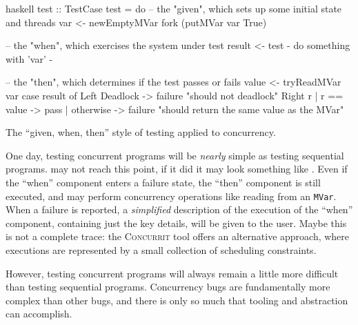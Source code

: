 \begin{listing}
\centering
\begin{cminted}{haskell}
test :: TestCase
test = do
    -- the "given", which sets up some initial state and threads
    var <- newEmptyMVar
    fork (putMVar var True)

    -- the "when", which exercises the system under test
    result <- test {- do something with 'var' -}

    -- the "then", which determines if the test passes or fails
    value <- tryReadMVar var
    case result of
      Left Deadlock -> failure "should not deadlock"
      Right r
        | r == value -> pass
        | otherwise -> failure "should return the same value as the MVar"
\end{cminted}
\caption{The ``given, when, then'' style of testing applied to concurrency.}\label{lst:3part}
\end{listing}

One day, testing concurrent programs will be \emph{nearly} simple as
testing sequential programs.  \dejafu{} may not reach this point, if
it did it may look something like .  Even if the
``when'' component enters a failure state, the ``then'' component is
still executed, and may perform concurrency operations like reading
from an \verb|MVar|.  When a failure is reported, a \emph{simplified}
description of the execution of the ``when'' component, containing
just the key details, will be given to the user.  Maybe this is not a
complete trace: the \textsc{Concurrit}\cite{elmas2013} tool offers an
alternative approach, where executions are represented by a small
collection of scheduling constraints.

However, testing concurrent programs will always remain a little more
difficult than testing sequential programs.  Concurrency bugs are
fundamentally more complex than other bugs, and there is only so much
that tooling and abstraction can accomplish.
